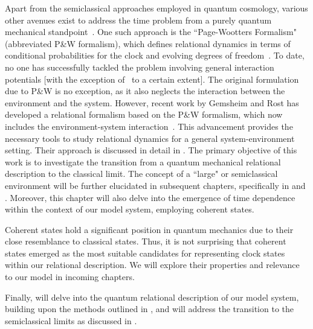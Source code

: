 Apart from the semiclassical approaches employed in quantum cosmology, various other avenues 
exist to address the time problem from a purely quantum mechanical standpoint~\cite{hohn2021trinity}. 
One such approach is the ``Page-Wootters Formalism" (abbreviated P\&W formalism), which defines 
relational dynamics in terms of conditional probabilities for the clock and evolving degrees of 
freedom~\cite{page1983evolution}. To date, no one has successfully tackled the problem involving 
general interaction potentials [with the exception of~\cite{Smith:2017pwx} to a certain extent]. 
The original formulation due to P\&W is no exception, as it also neglects the interaction between 
the environment and the system. However, recent work by Gemsheim and Rost has developed a relational 
formalism based on the P\&W formalism, which now includes the environment-system 
interaction~\cite{Gemsheim:2023izg}. This advancement provides the necessary tools to study 
relational dynamics for a general system-environment setting. Their approach is discussed in 
detail in . The primary objective of this work is to investigate the transition from a quantum mechanical 
relational description to the classical limit. The concept of a ``large" or semiclassical 
environment will be further elucidated in subsequent chapters, specifically in 
 and . 
Moreover, this chapter will also delve into the emergence of time dependence within the context of our model system, employing coherent states.

Coherent states hold a significant position in quantum mechanics due to their close 
resemblance to classical states. Thus, it is not surprising that coherent states 
emerged as the most suitable candidates for representing clock states within our 
relational description. We will explore their properties and relevance 
to our model in incoming chapters.

Finally,  will delve into the quantum relational 
description of our model system, building upon the methods outlined in 
, and will address the transition to the semiclassical 
limits as discussed in .

\newpage